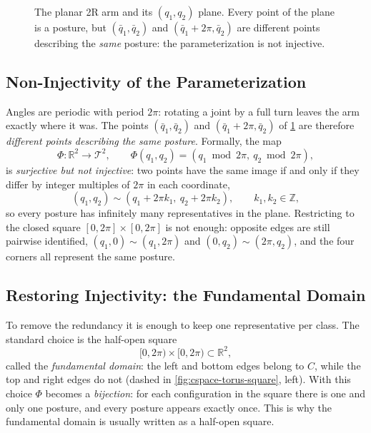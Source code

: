 \begin{figure}[ht]
{}
    \caption{The planar 2R arm and its $(q_1,q_2)$ plane. Every point of the
    plane is a posture, but $(\bar q_1,\bar q_2)$ and
    $(\bar q_1+2\pi,\bar q_2)$ are different points describing the
    \emph{same} posture: the parameterization is not injective.}
    \label{fig:cspace-arm-equivalence}
\end{figure}

\subsection{Non-Injectivity of the Parameterization}
\label{subsec:cspace-non-injective}

Angles are periodic with period \( 2\pi \): rotating a joint by a full
turn leaves the arm exactly where it was. The points
\( (\bar q_1, \bar q_2) \) and \( (\bar q_1 + 2\pi, \bar q_2) \) of
\cref{fig:cspace-arm-equivalence} are therefore \emph{different points
describing the same posture}. Formally, the map
\[
\Phi : \mathbb{R}^2 \to \mathcal{T}^2, \qquad
\Phi(q_1, q_2) = (q_1 \bmod 2\pi,\ q_2 \bmod 2\pi),
\]
is \emph{surjective but not injective}: two points have the same image
if and only if they differ by integer multiples of \( 2\pi \) in each
coordinate,
\[
(q_1, q_2) \sim (q_1 + 2\pi k_1,\ q_2 + 2\pi k_2),
\qquad k_1, k_2 \in \mathbb{Z},
\]
so every posture has infinitely many representatives in the plane.
Restricting to the closed square \( [0, 2\pi] \times [0, 2\pi] \) is not
enough: opposite edges are still pairwise identified,
\( (q_1, 0) \sim (q_1, 2\pi) \) and \( (0, q_2) \sim (2\pi, q_2) \), and
the four corners all represent the same posture.

\subsection{Restoring Injectivity: the Fundamental Domain}
\label{subsec:cspace-fundamental-domain}

To remove the redundancy it is enough to keep one representative per
class. The standard choice is the half-open square
\[
[0, 2\pi) \times [0, 2\pi) \subset \mathbb{R}^2,
\]
called the \emph{fundamental domain}: the left and bottom edges belong to
\( C \), while the top and right edges do not (dashed in
\cref{fig:cspace-torus-square}, left). With this choice \( \Phi \)
becomes a \emph{bijection}: for each configuration in the square there
is one and only one posture, and every posture appears exactly once.
This is why the fundamental domain is usually written as a half-open
square.

